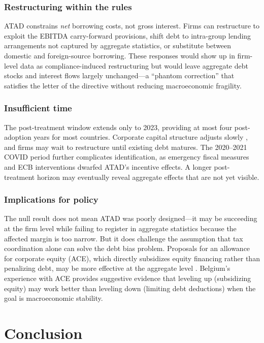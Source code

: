 \documentclass[12pt]{article}
\begin{document}
\subsubsection*{Restructuring within the rules} ATAD constrains \textit{net} borrowing costs, not gross interest. Firms can restructure to exploit the EBITDA carry-forward provisions, shift debt to intra-group lending arrangements not captured by aggregate statistics, or substitute between domestic and foreign-source borrowing. These responses would show up in firm-level data as compliance-induced restructuring but would leave aggregate debt stocks and interest flows largely unchanged---a ``phantom correction'' that satisfies the letter of the directive without reducing macroeconomic fragility.

\subsubsection*{Insufficient time} The post-treatment window extends only to 2023, providing at most four post-adoption years for most countries. Corporate capital structure adjusts slowly \citep{leary2005firms}, and firms may wait to restructure until existing debt matures. The 2020--2021 COVID period further complicates identification, as emergency fiscal measures and ECB interventions dwarfed ATAD's incentive effects. A longer post-treatment horizon may eventually reveal aggregate effects that are not yet visible.

\subsubsection*{Implications for policy} The null result does not mean ATAD was poorly designed---it may be succeeding at the firm level while failing to register in aggregate statistics because the affected margin is too narrow. But it does challenge the assumption that tax coordination alone can solve the debt bias problem. Proposals for an allowance for corporate equity (ACE), which directly subsidizes equity financing rather than penalizing debt, may be more effective at the aggregate level \citep{de2012tax, hebous2020not}. Belgium's experience with ACE provides suggestive evidence that leveling up (subsidizing equity) may work better than leveling down (limiting debt deductions) when the goal is macroeconomic stability.


\section{Conclusion}
\end{document}
